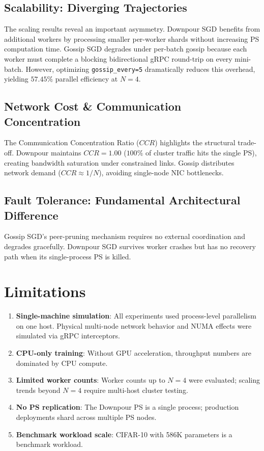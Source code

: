 \documentclass[conference]{IEEEtran}
\begin{document}
\subsection{Scalability: Diverging Trajectories}
The scaling results reveal an important asymmetry. Downpour SGD benefits from additional workers by processing smaller per-worker shards without increasing PS computation time. Gossip SGD degrades under per-batch gossip because each worker must complete a blocking bidirectional gRPC round-trip on every mini-batch. However, optimizing \texttt{gossip\_every=5} dramatically reduces this overhead, yielding $57.45\%$ parallel efficiency at $N=4$.

\subsection{Network Cost & Communication Concentration}
The Communication Concentration Ratio ($CCR$) highlights the structural trade-off. Downpour maintains $CCR=1.00$ ($100\%$ of cluster traffic hits the single PS), creating bandwidth saturation under constrained links. Gossip distributes network demand ($CCR \approx 1/N$), avoiding single-node NIC bottlenecks.

\subsection{Fault Tolerance: Fundamental Architectural Difference}
Gossip SGD's peer-pruning mechanism requires no external coordination and degrades gracefully. Downpour SGD survives worker crashes but has no recovery path when its single-process PS is killed.

\section{Limitations}

\begin{enumerate}
    \item \textbf{Single-machine simulation}: All experiments used process-level parallelism on one host. Physical multi-node network behavior and NUMA effects were simulated via gRPC interceptors.
    \item \textbf{CPU-only training}: Without GPU acceleration, throughput numbers are dominated by CPU compute.
    \item \textbf{Limited worker counts}: Worker counts up to $N=4$ were evaluated; scaling trends beyond $N=4$ require multi-host cluster testing.
    \item \textbf{No PS replication}: The Downpour PS is a single process; production deployments shard across multiple PS nodes.
    \item \textbf{Benchmark workload scale}: CIFAR-10 with 586K parameters is a benchmark workload.
\end{enumerate}
\end{document}
